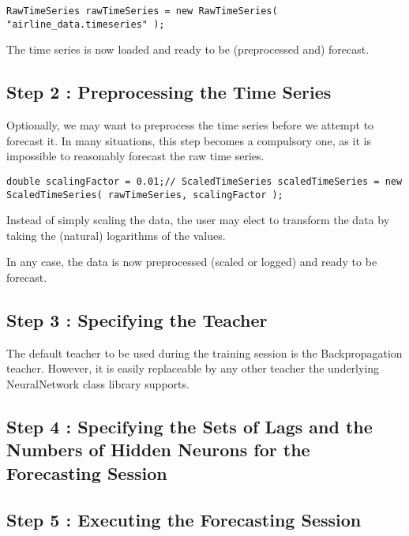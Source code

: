 \noindent \texttt{RawTimeSeries rawTimeSeries = new RawTimeSeries( "airline\_data.timeseries" );}

The time series is now loaded and ready to be (preprocessed and) forecast.

\subsection{Step 2 : Preprocessing the Time Series}

Optionally, we may want to preprocess the time series before we attempt to forecast it. In many situations, this step becomes a compulsory one, as it is impossible to reasonably forecast the raw time series.

\noindent \texttt{double scalingFactor = 0.01;//
ScaledTimeSeries scaledTimeSeries = new ScaledTimeSeries( rawTimeSeries, scalingFactor );}

Instead of simply scaling the data, the user may elect to transform the data by taking the (natural) logarithms of the values.

In any case, the data is now preprocessed (scaled or logged) and ready to be forecast.

\subsection{Step 3 : Specifying the Teacher}

The default teacher to be used during the training session is the Backpropagation teacher. However, it is easily replaceable by any other teacher the underlying NeuralNetwork class library supports.

\subsection{Step 4 : Specifying the Sets of Lags and the Numbers of Hidden Neurons for the Forecasting Session}

\subsection{Step 5 : Executing the Forecasting Session}